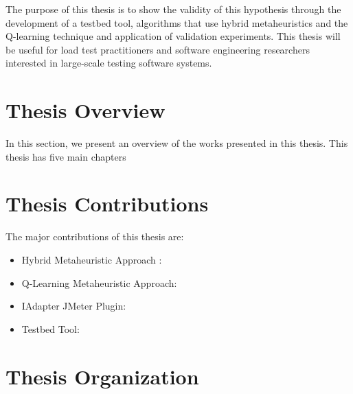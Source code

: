The purpose of this thesis is to show the validity of this hypothesis through the development of a testbed tool, algorithms that use hybrid metaheuristics and the Q-learning technique and application of validation experiments. This thesis will be useful for load test practitioners and software engineering researchers interested in large-scale testing software systems.


\section{Thesis Overview}

In this section, we present an overview of the works presented in this thesis. This thesis has five main chapters

\section{Thesis Contributions}

The major contributions of this thesis are:

\begin{itemize}
\item Hybrid Metaheuristic Approach \cite{Gois2016}: 
\item Q-Learning Metaheuristic Approach: 
\item IAdapter JMeter Plugin:
\item Testbed Tool: 
\end{itemize}




\section{Thesis Organization}


